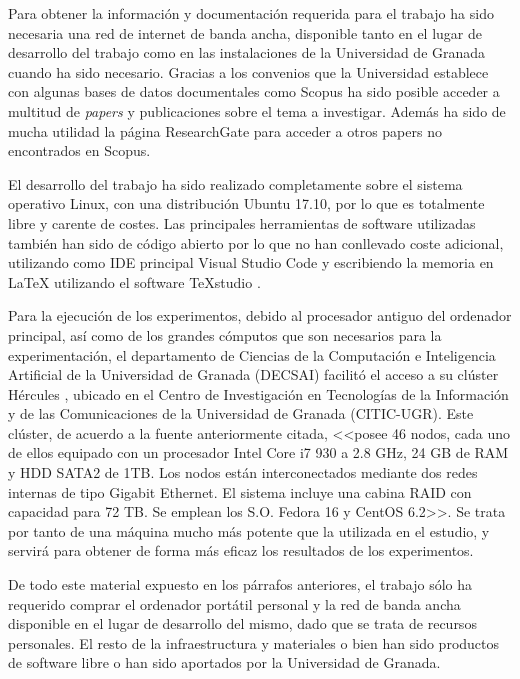 Para obtener la información y documentación requerida para el trabajo ha sido necesaria una red de internet de banda ancha, disponible tanto en el lugar de desarrollo del trabajo como en las instalaciones de la Universidad de Granada cuando ha sido necesario. Gracias a los convenios que la Universidad establece con algunas bases de datos documentales como Scopus \cite{scopus-website} ha sido posible acceder a multitud de \textit{papers} y publicaciones sobre el tema a investigar. Además ha sido de mucha utilidad la página ResearchGate \cite{research-gate-website} para acceder a otros papers no encontrados en Scopus.

El desarrollo del trabajo ha sido realizado completamente sobre el sistema operativo Linux, con una distribución Ubuntu 17.10, por lo que es totalmente libre y carente de costes. Las principales herramientas de software utilizadas también han sido de código abierto por lo que no han conllevado coste adicional, utilizando como IDE principal Visual Studio Code \cite{vscode-github} y escribiendo la memoria en LaTeX utilizando el software TeXstudio \cite{texstudio}.

Para la ejecución de los experimentos, debido al procesador antiguo del ordenador principal, así como de los grandes cómputos que son necesarios para la experimentación, el departamento de Ciencias de la Computación e Inteligencia Artificial de la Universidad de Granada (DECSAI) facilitó el acceso a su clúster Hércules \cite{cluster-hercules}, ubicado en el Centro de Investigación en Tecnologías de la Información y de las Comunicaciones de la Universidad de Granada (CITIC-UGR). Este clúster, de acuerdo a la fuente anteriormente citada, <<posee 46 nodos, cada uno de ellos equipado con un procesador Intel Core i7 930 a 2.8 GHz, 24 GB de RAM y HDD SATA2 de 1TB. Los nodos están interconectados mediante dos redes internas de tipo Gigabit Ethernet. El sistema incluye una cabina RAID con capacidad para 72 TB. Se emplean los S.O. Fedora 16 y CentOS 6.2>>. Se trata por tanto de una máquina mucho más potente que la utilizada en el estudio, y servirá para obtener de forma más eficaz los resultados de los experimentos.

De todo este material expuesto en los párrafos anteriores, el trabajo sólo ha requerido comprar el ordenador portátil personal y la red de banda ancha disponible en el lugar de desarrollo del mismo, dado que se trata de recursos personales. El resto de la infraestructura y materiales o bien han sido productos de software libre o han sido aportados por la Universidad de Granada.